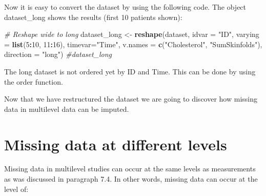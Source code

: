 \documentclass[
]{book}
\newenvironment{Shaded}{\begin{snugshade}}{\end{snugshade}}
\newcommand{\CommentTok}[1]{\textcolor[rgb]{0.56,0.35,0.01}{\textit{#1}}}
\newcommand{\DataTypeTok}[1]{\textcolor[rgb]{0.13,0.29,0.53}{#1}}
\newcommand{\DecValTok}[1]{\textcolor[rgb]{0.00,0.00,0.81}{#1}}
\newcommand{\KeywordTok}[1]{\textcolor[rgb]{0.13,0.29,0.53}{\textbf{#1}}}
\newcommand{\NormalTok}[1]{#1}
\newcommand{\OperatorTok}[1]{\textcolor[rgb]{0.81,0.36,0.00}{\textbf{#1}}}
\newcommand{\StringTok}[1]{\textcolor[rgb]{0.31,0.60,0.02}{#1}}
\begin{document}
Now it is easy to convert the dataset by using the following code. The
object dataset\_long shows the results (first 10 patients shown):

\begin{Shaded}
\begin{Highlighting}[]
\CommentTok{# Reshape wide to long}
\NormalTok{dataset_long <-}\StringTok{ }\KeywordTok{reshape}\NormalTok{(dataset, }\DataTypeTok{idvar =} \StringTok{"ID"}\NormalTok{, }\DataTypeTok{varying =} \KeywordTok{list}\NormalTok{(}\DecValTok{5}\OperatorTok{:}\DecValTok{10}\NormalTok{, }\DecValTok{11}\OperatorTok{:}\DecValTok{16}\NormalTok{), }\DataTypeTok{timevar=}\StringTok{"Time"}\NormalTok{, }
         \DataTypeTok{v.names =} \KeywordTok{c}\NormalTok{(}\StringTok{"Cholesterol"}\NormalTok{, }\StringTok{"SumSkinfolds"}\NormalTok{), }\DataTypeTok{direction =} \StringTok{"long"}\NormalTok{)}
\CommentTok{#dataset_long}
\end{Highlighting}
\end{Shaded}

The long dataset is not ordered yet by ID and Time. This can be done by
using the order function.

\begin{Shaded}
\end{Shaded}

Now that we have restructured the dataset we are going to discover how
missing data in multilevel data can be imputed.

\hypertarget{missing-data-at-different-levels}{%
\section{Missing data at different
levels}\label{missing-data-at-different-levels}}

Missing data in multilevel studies can occur at the same levels as
measurements as was discussed in paragraph 7.4. In other words, missing
data can occur at the level of:
\end{document}
